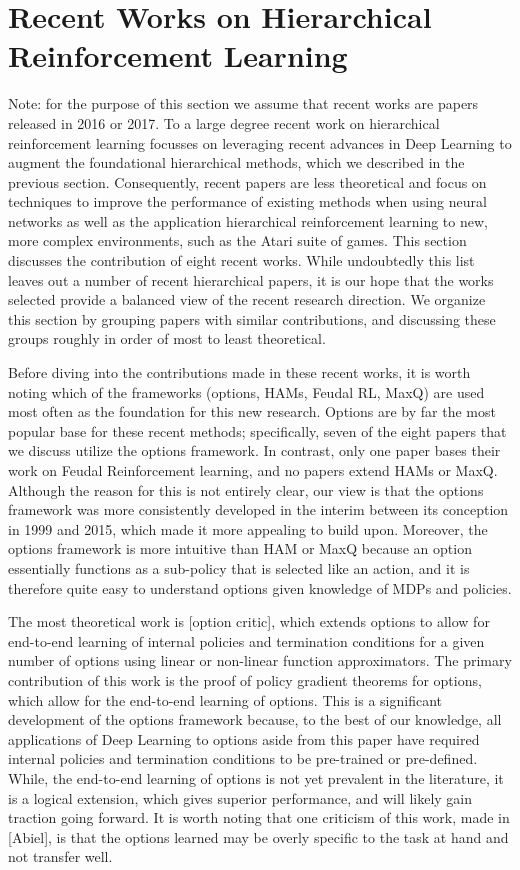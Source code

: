 \section{Recent Works on Hierarchical Reinforcement Learning}
Note: for the purpose of this section we assume that recent works are papers released in 2016 or 2017.
To a large degree recent work on hierarchical reinforcement learning focusses on leveraging recent advances in
Deep Learning to augment the foundational hierarchical methods, which we described in the previous section.
Consequently, recent papers are less theoretical and focus on techniques to improve the performance
of existing methods when using neural networks as well as the application hierarchical reinforcement learning
to new, more complex environments, such as the Atari suite of games.
This section discusses the contribution of eight recent works. While undoubtedly this list leaves out a number
of recent hierarchical papers, it is our hope that the works selected provide a balanced view of the recent
research direction. We organize this section by grouping papers with similar contributions, and discussing
these groups roughly in order of most to least theoretical.

Before diving into the contributions made in these recent works, it is worth noting which of the frameworks
(options, HAMs, Feudal RL, MaxQ) are used most often as the foundation for this new research.
Options are by far the most popular base for these recent methods; specifically, seven of the eight
papers that we discuss utilize the options framework. In contrast, only one paper bases their work
on Feudal Reinforcement learning, and no papers extend HAMs or MaxQ. Although the reason for this is
not entirely clear, our view is that the options framework was more consistently developed in the interim
between its conception in 1999 and 2015, which made it more appealing to build upon. Moreover, the options
framework is more intuitive than HAM or MaxQ because an option essentially functions as a sub-policy that is
selected like an action, and it is therefore quite easy to understand options given knowledge of MDPs and policies.

The most theoretical work is [option critic], which extends options to allow for end-to-end learning
of internal policies and termination conditions for a given number of options using
linear or non-linear function approximators. The primary contribution of this work is the proof
of policy gradient theorems for options, which allow for the end-to-end learning of options.
This is a significant development of the options framework because, to the best of our knowledge,
all applications of Deep Learning to options aside from this paper have required internal policies
and termination conditions to be pre-trained or pre-defined. While, the end-to-end learning of options
is not yet prevalent in the literature, it is a logical extension, which gives superior performance, and
will likely gain traction going forward. It is worth noting that one criticism of this work,
made in [Abiel], is that the options learned may be overly specific to the task at hand and not transfer well.

